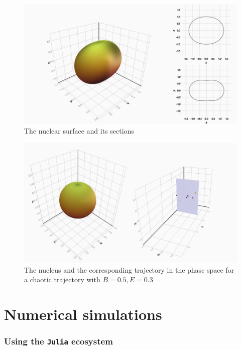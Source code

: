 \documentclass{beamer}
\begin{document}
\begin{frame}
	\begin{figure}
		\includegraphics[width=\textwidth]{nucleus-with-sections}
		\caption{The nuclear surface and its sections}
	\end{figure}
\end{frame}


\begin{frame}
	\begin{figure}
		\includegraphics[width=\textwidth]{nucleus-with-poincare}
		\caption{The nucleus and the corresponding trajectory in the phase space
		for a chaotic trajectory with \(B=0.5, E=0.3\)}
	\end{figure}
\end{frame}

\section{Numerical simulations}

\subsubsection{Using the \texttt{Julia} ecosystem}
\end{document}
